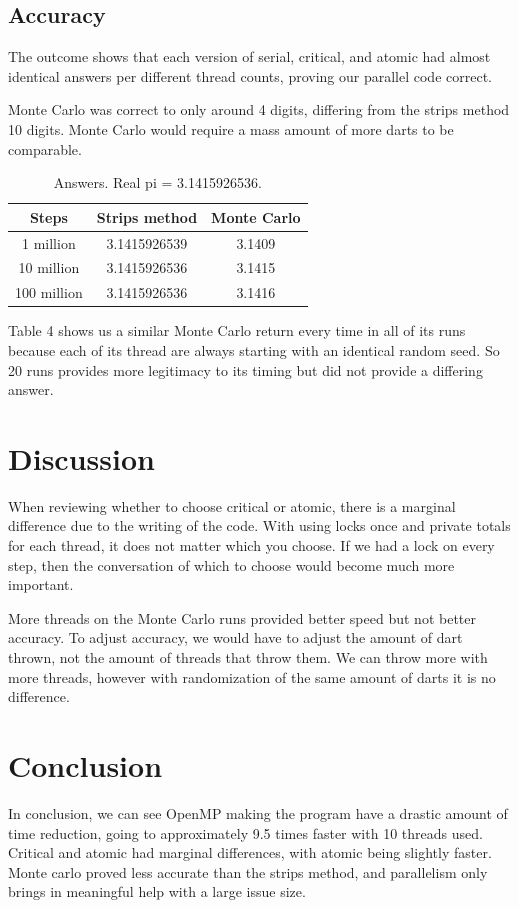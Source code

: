 \documentclass[11pt,twocolumn]{article}
\begin{document}
\subsection{Accuracy}
The outcome shows that each version of serial, critical, and atomic had almost identical answers per different thread counts, proving our parallel code correct. 

Monte Carlo was correct to only around 4 digits, differing from the strips method 10 digits. Monte Carlo would require a mass amount of more darts to be comparable.

\begin{table}[h]
\centering
\begin{tabular}{|c|c|c|}
\hline
Steps & Strips method & Monte Carlo \\
\hline
1 million   & 3.1415926539 & 3.1409 \\
10 million  & 3.1415926536 & 3.1415 \\
100 million & 3.1415926536 & 3.1416 \\
\hline
\end{tabular}
\caption{Answers. Real pi = 3.1415926536.}
\label{tab:acc}
\end{table}

Table 4 shows us a similar Monte Carlo return every time in all of its runs because each of its thread are always starting with an identical random seed. So 20 runs provides more legitimacy to its timing but did not provide a differing answer. 


\section{Discussion}
When reviewing whether to choose critical or atomic, there is a marginal difference due to the writing of the code. With using locks once and private totals for each thread, it does not matter which you choose. If we had a lock on every step, then the conversation of which to choose would become much more important. 

More threads on the Monte Carlo runs provided better speed but not better accuracy. To adjust accuracy, we would have to adjust the amount of dart thrown, not the amount of threads that throw them. We can throw more with more threads, however with randomization of the same amount of darts it is no difference.


\section{Conclusion}
In conclusion, we can see OpenMP making the program have a drastic amount of time reduction, going to approximately 9.5 times faster with 10 threads used. Critical and atomic had marginal differences, with atomic being slightly faster. Monte carlo proved less accurate than the strips method, and parallelism only brings in meaningful help with a large issue size. 
\end{document}
